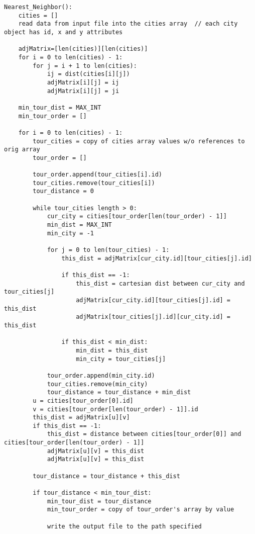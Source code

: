 \documentclass[../report/main.tex]{subfiles}
\begin{document}
\begin{verbatim}
Nearest_Neighbor():
    cities = []
    read data from input file into the cities array  // each city object has id, x and y attributes

    adjMatrix=[len(cities)][len(cities)]
    for i = 0 to len(cities) - 1:
        for j = i + 1 to len(cities):
            ij = dist(cities[i][j])
            adjMatrix[i][j] = ij
            adjMatrix[i][j] = ji

    min_tour_dist = MAX_INT
    min_tour_order = []

    for i = 0 to len(cities) - 1:
        tour_cities = copy of cities array values w/o references to orig array
        tour_order = []

        tour_order.append(tour_cities[i].id)
        tour_cities.remove(tour_cities[i])
        tour_distance = 0

        while tour_cities length > 0:
            cur_city = cities[tour_order[len(tour_order) - 1]]
            min_dist = MAX_INT
            min_city = -1

            for j = 0 to len(tour_cities) - 1:
                this_dist = adjMatrix[cur_city.id][tour_cities[j].id]

                if this_dist == -1:
                    this_dist = cartesian dist between cur_city and tour_cities[j]
                    adjMatrix[cur_city.id][tour_cities[j].id] = this_dist
                    adjMatrix[tour_cities[j].id][cur_city.id] = this_dist

                if this_dist < min_dist:
                    min_dist = this_dist
                    min_city = tour_cities[j]

            tour_order.append(min_city.id)
            tour_cities.remove(min_city)
            tour_distance = tour_distance + min_dist
        u = cities[tour_order[0].id]
        v = cities[tour_order[len(tour_order) - 1]].id
        this_dist = adjMatrix[u][v]
        if this_dist == -1:
            this_dist = distance between cities[tour_order[0]] and cities[tour_order[len(tour_order) - 1]]
            adjMatrix[u][v] = this_dist
            adjMatrix[u][v] = this_dist

        tour_distance = tour_distance + this_dist

        if tour_distance < min_tour_dist:
            min_tour_dist = tour_distance
            min_tour_order = copy of tour_order's array by value 

            write the output file to the path specified

\end{verbatim}
\end{document}
